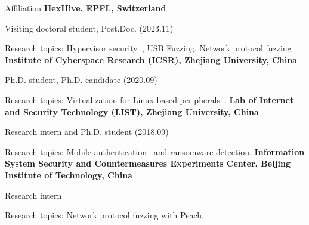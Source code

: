 \begin{rubric}{Affiliation}
\entry*[2023.02 -- 202x.xx]
	\textbf{HexHive, EPFL, Switzerland}
	\par Visiting doctoral student, Post.Doc. (2023.11)
	\par Research topics: Hypervisor security~\cite{videzzo@2023,alxdr2024hyperpill}, USB Fuzzing, Network protocol fuzzing
\entry*[2019.05 -- 2023.09]
	\textbf{Institute of Cyberspace Research (ICSR), Zhejiang University, China}
	\par Ph.D. student, Ph.D. candidate (2020.09)
	\par Research topics: Virtualization for Linux-based peripherals~\cite{liu2021firmguide,jiang2021ecmo,videzzo@2023}.
\entry*[2017.07 -- 2019.04]
    \textbf{Lab of Internet and Security Technology (LIST), Zhejiang University, China}
	\par Research intern and Ph.D. student (2018.09)
	\par Research topics: Mobile authentication~\cite{espialcog@2020,onecycleattack@2021,trapcog@2023} and ransomware detection.
\entry*[2016.09 -- 2017.06]
	\textbf{Information System Security and Countermeasures Experiments Center,
	Beijing Institute of Technology, China} 
	\par Research intern
	\par Research topics: Network protocol fuzzing with Peach.
\end{rubric}